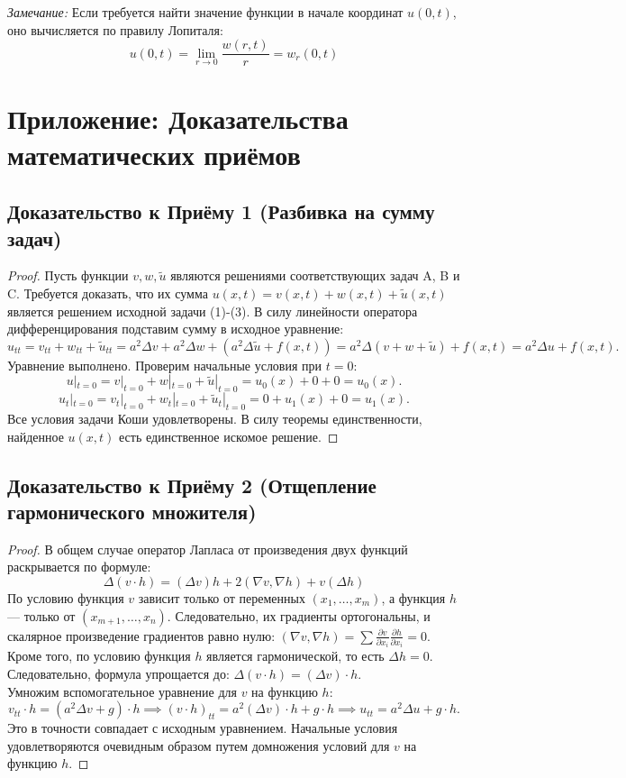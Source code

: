 \documentclass[a4paper,10pt]{article}
\begin{document}
\vspace{0.2cm}
\noindent\textit{Замечание:} Если требуется найти значение функции в начале координат $u(0,t)$, оно вычисляется по правилу Лопиталя:
\[
u(0,t) = \lim_{r \to 0} \frac{w(r,t)}{r} = w_r(0,t)
\]

\newpage
\appendix
\section{Приложение: Доказательства математических приёмов}

\subsection*{Доказательство к Приёму 1 (Разбивка на сумму задач)}
\begin{proof}
Пусть функции $v, w, \tilde{u}$ являются решениями соответствующих задач A, B и C. Требуется доказать, что их сумма $u(x,t) = v(x,t) + w(x,t) + \tilde{u}(x,t)$ является решением исходной задачи (1)-(3).
В силу линейности оператора дифференцирования подставим сумму в исходное уравнение:
\[
u_{tt} = v_{tt} + w_{tt} + \tilde{u}_{tt} = a^2\Delta v + a^2\Delta w + (a^2\Delta \tilde{u} + f(x,t)) = a^2\Delta(v+w+\tilde{u}) + f(x,t) = a^2\Delta u + f(x,t).
\]
Уравнение выполнено. Проверим начальные условия при $t=0$:
\[
u|_{t=0} = v|_{t=0} + w|_{t=0} + \tilde{u}|_{t=0} = u_0(x) + 0 + 0 = u_0(x).
\]
\[
u_t|_{t=0} = v_t|_{t=0} + w_t|_{t=0} + \tilde{u}_t|_{t=0} = 0 + u_1(x) + 0 = u_1(x).
\]
Все условия задачи Коши удовлетворены. В силу теоремы единственности, найденное $u(x,t)$ есть единственное искомое решение.
\end{proof}

\subsection*{Доказательство к Приёму 2 (Отщепление гармонического множителя)}
\begin{proof}
В общем случае оператор Лапласа от произведения двух функций раскрывается по формуле:
\[ \Delta(v \cdot h) = (\Delta v)h + 2(\nabla v, \nabla h) + v(\Delta h) \]
По условию функция $v$ зависит только от переменных $(x_1, \dots, x_m)$, а функция $h$ — только от $(x_{m+1}, \dots, x_n)$. Следовательно, их градиенты ортогональны, и скалярное произведение градиентов равно нулю: $(\nabla v, \nabla h) = \sum \frac{\partial v}{\partial x_i}\frac{\partial h}{\partial x_i} = 0$. 
Кроме того, по условию функция $h$ является гармонической, то есть $\Delta h = 0$. 
Следовательно, формула упрощается до: $\Delta(v \cdot h) = (\Delta v) \cdot h$. \\
Умножим вспомогательное уравнение для $v$ на функцию $h$:
\[
v_{tt} \cdot h = (a^2\Delta v + g) \cdot h \implies (v \cdot h)_{tt} = a^2(\Delta v) \cdot h + g \cdot h \implies u_{tt} = a^2\Delta u + g \cdot h.
\]
Это в точности совпадает с исходным уравнением. Начальные условия удовлетворяются очевидным образом путем домножения условий для $v$ на функцию $h$.
\end{proof}
\end{document}

